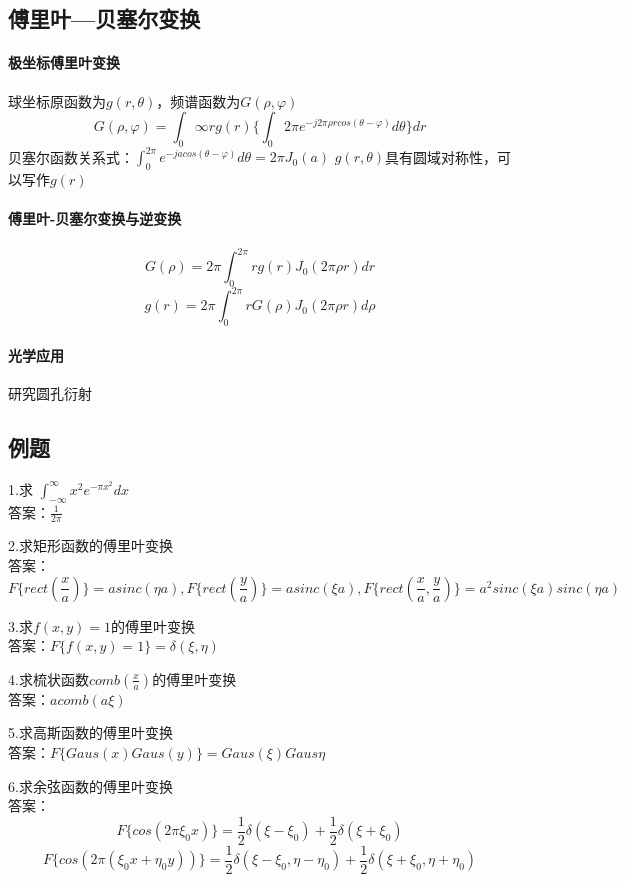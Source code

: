 \documentclass[UTF8]{ctexart}
\newcommand{\f}[2]{\frac{#1}{#2}}%
\begin{document}
\subsection{傅里叶—贝塞尔变换}
\paragraph{极坐标傅里叶变换}球坐标原函数为$g(r,\theta)$，频谱函数为$G(\rho,\varphi)$
\[
  G(\rho,\varphi)=\int_{0}{\infty}rg(r)\{\int_{0}{2\pi}e^{-j2\pi\rho rcos(\theta-\varphi)}d\theta\}dr
  \]
  贝塞尔函数关系式：$\int_{0}^{2\pi}e^{-jacos(\theta-\varphi)}d\theta=2\pi J_{0}(a)$
$g(r,\theta)$具有圆域对称性，可以写作$g(r)$
\paragraph{傅里叶-贝塞尔变换与逆变换}
\[
    G(\rho)=2\pi\int_{0}^{2\pi}rg(r)J_{0}(2\pi\rho r)dr
    \]
\[
    g(r)=2\pi\int_{0}^{2\pi}rG(\rho)J_{0}(2\pi\rho r)d\rho
    \]
\paragraph{光学应用}研究圆孔衍射   

\subsection{例题}
1.求
$\int_{-\infty}^{\infty}x^2e^{-\pi x^2}dx$\\
答案：$\f{1}{2\pi}$

2.求矩形函数的傅里叶变换\\
答案：\[ F\{rect(\f{x}{a})\}=asinc(\eta a),F\{rect(\f{y}{a})\}=asinc(\xi a),F\{rect(\f{x}{a},\f{y}{a})\}=a^2sinc(\xi a)sinc(\eta a)
\]

3.求$f(x,y)=1$的傅里叶变换\\
答案：$F\{f(x,y)=1\}=\delta(\xi,\eta)$

4.求梳状函数$comb(\f{x}{a})$的傅里叶变换\\
答案：$acomb(a\xi)$

5.求高斯函数的傅里叶变换\\
答案：$F\{Gaus(x)Gaus(y)\}=Gaus(\xi)Gaus{\eta}$

6.求余弦函数的傅里叶变换\\
答案：\[
    F\{cos(2\pi \xi_{0}x)\}=\f{1}{2}\delta(\xi-\xi_{0})+\f{1}{2}\delta(\xi+\xi_{0})
\]
\[
    F\{cos(2\pi (\xi_{0}x+\eta_{0}y))\}=\f{1}{2}\delta(\xi-\xi_{0},\eta-\eta_{0})+\f{1}{2}\delta(\xi+\xi_{0},\eta+\eta_{0})
\]
\end{document}
